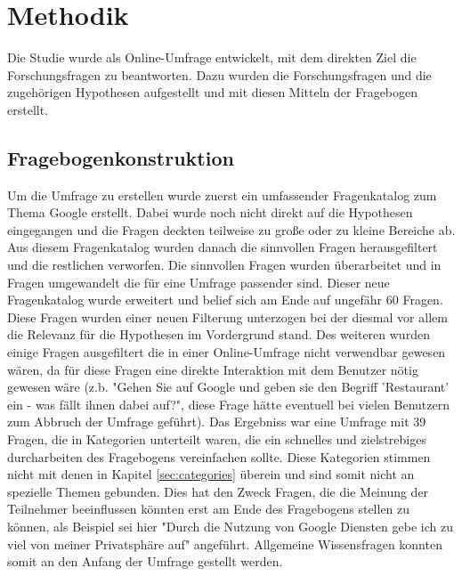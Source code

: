 %
% 

\chapter{Methodik}

Die Studie wurde als Online-Umfrage entwickelt, mit dem direkten Ziel die Forschungsfragen zu beantworten. Dazu wurden die Forschungsfragen und die zugehörigen Hypothesen aufgestellt und mit diesen Mitteln der Fragebogen erstellt.

\section{Fragebogenkonstruktion}
Um die Umfrage zu erstellen wurde zuerst ein umfassender Fragenkatalog zum Thema Google erstellt. Dabei wurde noch nicht direkt auf die Hypothesen eingegangen und die Fragen deckten teilweise zu große oder zu kleine Bereiche ab. Aus diesem Fragenkatalog wurden danach die sinnvollen Fragen herausgefiltert und die restlichen verworfen. Die sinnvollen Fragen wurden überarbeitet und in Fragen umgewandelt die für eine Umfrage passender sind. Dieser neue Fragenkatalog wurde erweitert und belief sich am Ende auf ungefähr 60 Fragen.
Diese Fragen wurden einer neuen Filterung unterzogen bei der diesmal vor allem die Relevanz für die Hypothesen im Vordergrund stand. Des weiteren wurden einige Fragen ausgefiltert die in einer Online-Umfrage nicht verwendbar gewesen wären, da für diese Fragen eine direkte Interaktion mit dem Benutzer nötig gewesen wäre (z.b. "Gehen Sie auf Google und geben sie den Begriff 'Restaurant' ein - was fällt ihnen dabei auf?", diese Frage hätte eventuell bei vielen Benutzern zum Abbruch der Umfrage geführt). Das Ergebniss war eine Umfrage mit 39 Fragen, die in Kategorien unterteilt waren, die ein schnelles und zielstrebiges durcharbeiten des Fragebogens vereinfachen sollte. Diese Kategorien stimmen nicht mit denen in Kapitel \ref{sec:categories} überein und sind somit nicht an spezielle Themen gebunden. Dies hat den Zweck Fragen, die die Meinung der Teilnehmer beeinflussen könnten erst am Ende des Fragebogens stellen zu können, als Beispiel sei hier "Durch die Nutzung von Google Diensten gebe ich zu viel von meiner Privatsphäre auf" angeführt. Allgemeine Wissensfragen konnten somit an den Anfang der Umfrage gestellt werden.
